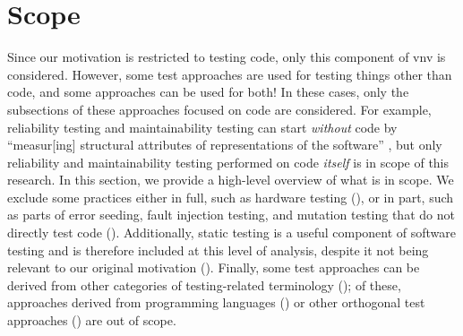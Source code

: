 \section{Scope}
\label{scope}

Since our motivation is restricted to testing code, only this component of
\acf{vnv} is considered. However, some test approaches
are used for testing things other than code, and some approaches can be used
for both! In these cases, only the subsections of these approaches focused on
code are considered. For example, reliability testing and maintainability
testing can start \emph{without} code by ``measur[ing] structural attributes
of representations of the software'' \citep[p.~18]{FentonAndPfleeger1997}, but
only reliability and maintainability testing performed on code \emph{itself} is
in scope of this research.
\ifnotpaper
    In this section, we provide a high-level overview of what is in scope. We
    exclude some practices either in full, such as hardware testing
    (), or in part, such as parts of error seeding, fault
    injection testing, and mutation testing that do not directly test code
    ().
    Additionally, static testing is a useful component of software testing and
    is therefore included at this level of analysis, despite it not being
    relevant to our original motivation (). Finally, some
    test approaches can be derived from other categories of testing-related
    terminology (); of these, approaches derived from
    programming languages () or other orthogonal test
    approaches () are out of scope.
\fi